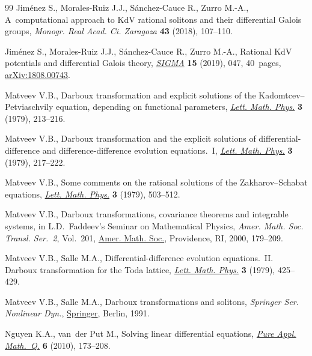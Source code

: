 \documentclass[10pt,a4paper]{amsart}
\numberwithin{equation}{section}
\begin{document}
\begin{thebibliography}{99}
Jim\'enez S., Morales-Ruiz J.J., S\'anchez-Cauce R., Zurro M.-A., A~computational approach to {K}d{V} rational solitons and their differential
 {G}alois groups, \textit{Monogr. Real Acad. Ci. Zaragoza} \textbf{43} (2018),
 107--110.

Jim\'enez S., Morales-Ruiz J.J., S\'anchez-Cauce R., Zurro M.-A., Rational
 {K}d{V} potentials and differential {G}alois theory, \href{https://doi.org/10.3842/SIGMA.2019.047}{\textit{SIGMA}}
 \textbf{15} (2019), 047, 40~pages, \href{https://arxiv.org/abs/1808.00743}{arXiv:1808.00743}.

Matveev V.B., Darboux transformation and explicit solutions of the
 {K}adomtcev--{P}etviaschvily equation, depending on functional parameters,
 \href{https://doi.org/10.1007/BF00405295}{\textit{Lett. Math. Phys.}} \textbf{3} (1979), 213--216.

Matveev V.B., Darboux transformation and the explicit solutions of
 differential-difference and difference-difference evolution equations.~{I},
 \href{https://doi.org/10.1007/BF00405296}{\textit{Lett. Math. Phys.}} \textbf{3} (1979), 217--222.

Matveev V.B., Some comments on the rational solutions of the
 {Z}akharov--{S}chabat equations, \href{https://doi.org/10.1007/BF00401932}{\textit{Lett. Math. Phys.}} \textbf{3}
 (1979), 503--512.

Matveev V.B., Darboux transformations, covariance theorems and integrable
 systems, in L.{D}.~{F}addeev's {S}eminar on {M}athematical {P}hysics,
 \textit{Amer. Math. Soc. Transl. Ser.~2}, Vol.~201, \href{https://doi.org/10.1090/trans2/201/11}{Amer. Math. Soc.},
 Providence, RI, 2000, 179--209.

Matveev V.B., Salle M.A., Differential-difference evolution equations.~{II}.
 {D}arboux transformation for the {T}oda lattice, \href{https://doi.org/10.1007/BF00397217}{\textit{Lett. Math. Phys.}}
 \textbf{3} (1979), 425--429.

Matveev V.B., Salle M.A., Darboux transformations and solitons, \textit{Springer Ser.
 Nonlinear Dyn.}, \href{https://doi.org/10.1007/978-3-662-00922-2}{Springer}, Berlin, 1991.

Nguyen K.A., van~der Put M., Solving linear differential equations,
 \href{https://doi.org/10.4310/PAMQ.2010.v6.n1.a5}{\textit{Pure Appl. Math.~Q.}} \textbf{6} (2010), 173--208.


\end{thebibliography}
\end{document}
